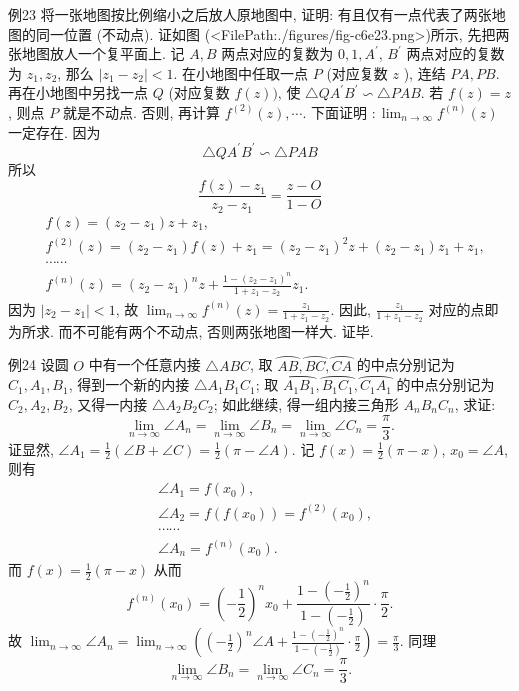 例23 将一张地图按比例缩小之后放人原地图中, 证明: 有且仅有一点代表了两张地图的同一位置 (不动点).
证如图 (<FilePath:./figures/fig-c6e23.png>)所示, 先把两张地图放人一个复平面上.
记 $A, B$ 两点对应的复数为 $0,1, A^{\prime}$, $B^{\prime}$ 两点对应的复数为 $z_1, z_2$, 那么 $\left|z_1-z_2\right|<1$.
在小地图中任取一点 $P$ (对应复数 $z$ ), 连结 $P A, P B$. 再在小地图中另找一点 $Q$ (对应复数 $f(z))$, 使 $\triangle Q A^{\prime} B^{\prime} \backsim \triangle P A B$.
若 $f(z)=z$, 则点 $P$ 就是不动点.
否则, 再计算 $f^{(2)}(z), \cdots$. 下面证明 $: \lim _{n \rightarrow \infty} f^{(n)}(z)$ 一定存在.
因为
$$
\triangle Q A^{\prime} B^{\prime} \backsim \triangle P A B
$$
所以
$$
\frac{f(z)-z_1}{z_2-z_1}=\frac{z-O}{1-O}
$$
$$
\begin{aligned}
& f(z)=\left(z_2-z_1\right) z+z_1, \\
& f^{(2)}(z)=\left(z_2-z_1\right) f(z)+z_1=\left(z_2-z_1\right)^2 z+\left(z_2-z_1\right) z_1+z_1, \\
& \cdots \cdots \\
& f^{(n)}(z)=\left(z_2-z_1\right)^n z+\frac{1-\left(z_2-z_1\right)^n}{1+z_1-z_2} z_1 .
\end{aligned}
$$
因为 $\left|z_2-z_1\right|<1$, 故 $\lim _{n \rightarrow \infty} f^{(n)}(z)=\frac{z_1}{1+z_1-z_2}$.
因此, $\frac{z_1}{1+z_1-z_2}$ 对应的点即为所求.
而不可能有两个不动点, 否则两张地图一样大.
证毕.



例24 设圆 $O$ 中有一个任意内接 $\triangle A B C$, 取 $\overparen{A B}, \overparen{B C}, \overparen{C A}$ 的中点分别记为 $C_1, A_1, B_1$, 得到一个新的内接 $\triangle A_1 B_1 C_1$; 取 $\overparen{A_1 B_1}, \overparen{B_1 C_1}, \overparen{C_1 A_1}$ 的中点分别记为 $C_2, A_2, B_2$, 又得一内接 $\triangle A_2 B_2 C_2$; 如此继续, 得一组内接三角形 $A_n B_n C_n$, 求证:
$$
\lim _{n \rightarrow \infty} \angle A_n=\lim _{n \rightarrow \infty} \angle B_n=\lim _{n \rightarrow \infty} \angle C_n=\frac{\pi}{3} .
$$
证显然, $\angle A_1=\frac{1}{2}(\angle B+\angle C)=\frac{1}{2}(\pi-\angle A)$. 记 $f(x)=\frac{1}{2}(\pi-x)$, $x_0=\angle A$, 则有
$$
\begin{aligned}
& \angle A_1=f\left(x_0\right), \\
& \angle A_2=f\left(f\left(x_0\right)\right)=f^{(2)}\left(x_0\right), \\
& \cdots \cdots \\
& \angle A_n=f^{(n)}\left(x_0\right) .
\end{aligned}
$$
而 $f(x)=\frac{1}{2}(\pi-x)$ 从而
$$
f^{(n)}\left(x_0\right)=\left(-\frac{1}{2}\right)^n x_0+\frac{1-\left(-\frac{1}{2}\right)^n}{1-\left(-\frac{1}{2}\right)} \cdot \frac{\pi}{2} .
$$
故 $\lim _{n \rightarrow \infty} \angle A_n=\lim _{n \rightarrow \infty}\left(\left(-\frac{1}{2}\right)^n \angle A+\frac{1-\left(-\frac{1}{2}\right)^n}{1-\left(-\frac{1}{2}\right)} \cdot \frac{\pi}{2}\right)=\frac{\pi}{3}$.
同理
$$
\lim _{n \rightarrow \infty} \angle B_n=\lim _{n \rightarrow \infty} \angle C_n=\frac{\pi}{3} .
$$



